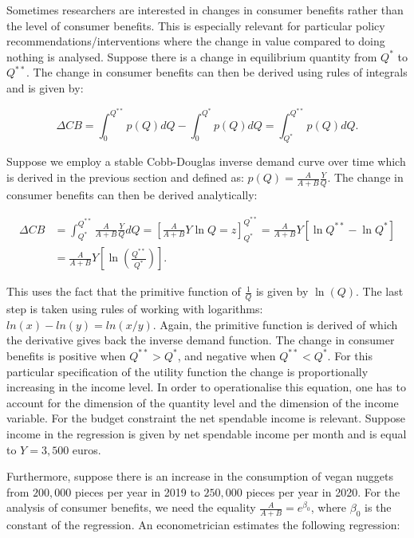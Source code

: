 \documentclass[
]{book}
\begin{document}
Sometimes researchers are interested in changes in consumer benefits rather than the level of consumer benefits. This is especially relevant for particular policy recommendations/interventions where the change in value compared to doing nothing is analysed. Suppose there is a change in equilibrium quantity from \(Q^\ast\) to \(Q^{\ast\ast}\). The change in consumer benefits can then be derived using rules of integrals and is given by:

\begin{equation}
 \Delta CB = \int_0^{Q^{\ast\ast}} p(Q)dQ -  \int_0^{Q^\ast} p(Q)dQ =  \int_{Q^\ast}^{Q^{\ast\ast}} p(Q)dQ.
\end{equation}

Suppose we employ a stable Cobb-Douglas inverse demand curve over time which is derived in the previous section and defined as: \(p(Q)=\frac{A}{A+B}\frac{Y}{Q}\). The change in consumer benefits can then be derived analytically:

\begin{align}
 \Delta CB &= \int_{Q^\ast}^{Q^{\ast\ast}} \frac{A}{A+B}\frac{Y}{Q} dQ = \left[\frac{A}{A+B} Y \ln Q = z  \right]^{Q^{\ast\ast}}_{Q^\ast} = \frac{A}{A+B} Y \left[\ln Q^{\ast\ast} - \ln Q^\ast \right] \\
 &= \frac{A}{A+B} Y \left[\ln \left(\frac{Q^{\ast\ast}}{Q^\ast}\right) \right].
\end{align}

This uses the fact that the primitive function of \(\frac{1}{Q}\) is given by \(\ln(Q)\). The last step is taken using rules of working with logarithms: \(ln(x)-ln(y)=ln(x/y)\). Again, the primitive function is derived of which the derivative gives back the inverse demand function. The change in consumer benefits is positive when \(Q^{\ast\ast}>Q^\ast\), and negative when \(Q^{\ast\ast}<Q^\ast\). For this particular specification of the utility function the change is proportionally increasing in the income level. In order to operationalise this equation, one has to account for the dimension of the quantity level and the dimension of the income variable. For the budget constraint the net spendable income is relevant. Suppose income in the regression is given by net spendable income per month and is equal to \(Y=3,500\) euros.

Furthermore, suppose there is an increase in the consumption of vegan nuggets from \(200,000\) pieces per year in 2019 to \(250,000\) pieces per year in 2020. For the analysis of consumer benefits, we need the equality \(\frac{A}{A+B}=e^{\beta_0}\), where \(\beta_0\) is the constant of the regression. An econometrician estimates the following regression:
\end{document}
